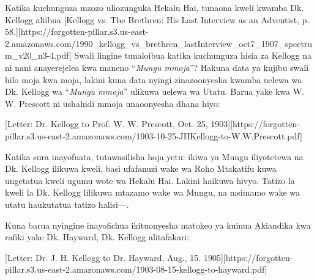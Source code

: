 Katika kuchunguza mzozo uliozunguka Hekalu Hai, tunaona kweli kwamba Dk. Kellogg aliibua [Kellogg vs. The Brethren: His Last Interview as an Adventist, p. 58.][https://forgotten-pillar.s3.us-east-2.amazonaws.com/1990\_kellogg\_vs\_brethren\_lastInterview\_oct7\_1907\_spectrum\_v20\_n3-4.pdf] Swali lingine tunaloibua katika kuchunguza hisia za Kellogg na  ni nani anayerejelea kwa maneno “\textit{Mungu mmoja}”? Hakuna data ya kujibu swali hilo moja kwa moja, lakini kuna data nyingi zinazoonyesha kwamba uelewa wa Dk. Kellogg wa “\textit{Mungu mmoja}” ulikuwa uelewa wa Utatu. Barua yake kwa W. W. Prescott ni ushahidi mmoja unaoonyesha dhana hiyo:

[Letter: Dr. Kellogg to Prof. W. W. Prescott, Oct. 25, 1903][https://forgotten-pillar.s3.us-east-2.amazonaws.com/1903-10-25-JHKellogg-to-W.W.Prescott.pdf]

Katika sura inayofuata, tutawasilisha hoja yetu: ikiwa  ya Mungu iliyotetewa na Dk. Kellogg ilikuwa kweli, basi ufafanuzi wake wa Roho Mtakatifu kuwa  ungetatua kweli ugumu wote wa Hekalu Hai. Lakini haikuwa hivyo. Tatizo la kweli la Dk. Kellogg lilikuwa mtazamo wake wa Mungu, na msimamo wake wa utatu haukutatua tatizo halisi—.

Kuna barua nyingine inayofichua ikituonyesha matokeo ya kuinua  Akiandika kwa rafiki yake Dk. Hayward, Dk. Kellogg alitafakari:


[Letter: Dr. J. H. Kellogg to Dr. Hayward, Aug., 15. 1905][https://forgotten-pillar.s3.us-east-2.amazonaws.com/1903-08-15-kellogg-to-hayward.pdf]

